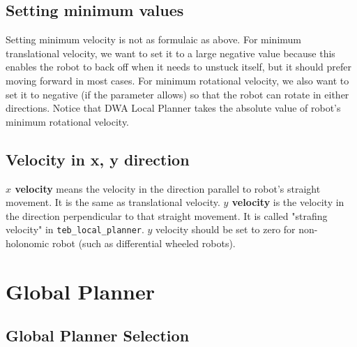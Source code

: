 \documentclass[12pt]{article}
\begin{document}

\subsection{Setting minimum values}
Setting minimum velocity is not as formulaic as above. For minimum translational velocity, we want to set it to a large negative value
because this enables the robot to back off when it needs to unstuck itself, but it should prefer moving forward in most cases. For minimum rotational velocity, we also want to set it to negative (if the parameter allows) so that the robot can rotate in either directions. Notice that DWA Local Planner takes the absolute value of robot's minimum rotational velocity.

\subsection{Velocity in x, y direction}

\textbf{$x$ velocity} means the velocity in the direction parallel to robot's straight movement. It is the same as translational velocity. \textbf{$y$ velocity} is the velocity in the direction perpendicular to that straight movement. It is called "strafing velocity" in \texttt{teb\_local\_planner}. $y$ velocity should be set to zero for non-holonomic robot (such as
differential wheeled robots).\\

\section{Global Planner}

\subsection{Global Planner Selection}
\end{document}
